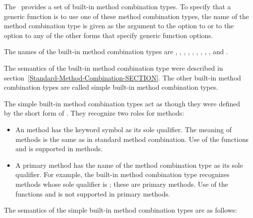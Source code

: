 The \CLOS\ provides a set of built-in method combination types.  To
specify that a generic function is to use one of these method
combination types, the name of the method combination type is given as
the argument to the  option to 
 or to the  option to any of the
other forms that specify generic function options.

The names of the built-in  method combination types are
\cd{+}, , , , , , 
, , , and .

The semantics of the  built-in method combination type were
described in section~\ref{Standard-Method-Combination-SECTION}.  The other
built-in method combination types are called {\bit simple built-in method
combination types.}

The simple built-in method combination types act as though they were
defined by the short form of .  They
recognize two roles for methods:

\begin{itemize}

\item  An  method has the keyword symbol 
 as its sole qualifier.  The meaning of 
methods is the same as in standard method combination.  Use of the
functions  and  is supported
in  methods.

\item  A primary method has the name of the method combination
type as its sole qualifier.  For example, the built-in method
combination type  recognizes methods whose sole qualifier is
; these are primary methods. Use of the functions 
 and  is not supported in primary
methods.

\end{itemize}
The semantics of the simple built-in method combination types are as
follows:

